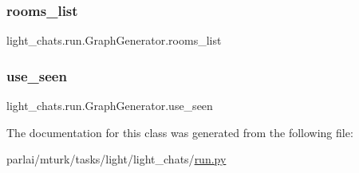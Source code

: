 \subsubsection{\texorpdfstring{rooms\+\_\+list}{rooms\_list}}
{\footnotesize\ttfamily light\+\_\+chats.\+run.\+Graph\+Generator.\+rooms\+\_\+list}

\mbox{\label{classlight__chats_1_1run_1_1GraphGenerator_a81da652d9cbc091fba5d410630750c39}} 
\subsubsection{\texorpdfstring{use\+\_\+seen}{use\_seen}}
{\footnotesize\ttfamily light\+\_\+chats.\+run.\+Graph\+Generator.\+use\+\_\+seen}



The documentation for this class was generated from the following file\+:\begin{DoxyCompactItemize}
\item 
parlai/mturk/tasks/light/light\+\_\+chats/\hyperlink{parlai_2mturk_2tasks_2light_2light__chats_2run_8py}{run.\+py}\end{DoxyCompactItemize}

